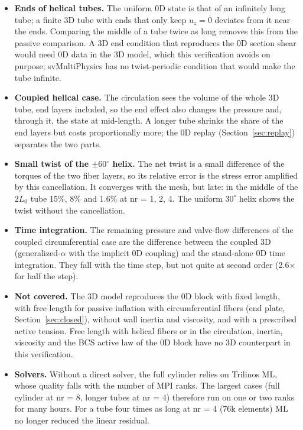 \begin{itemize}
\item \textbf{Ends of helical tubes.} The uniform 0D state is that of an infinitely long
tube; a finite 3D tube with ends that only keep $u_z = 0$ deviates from it near the ends.
Comparing the middle of a tube twice as long removes this from the passive comparison. A 3D end
condition that reproduces the 0D section shear would need 0D data in the 3D model, which
this verification avoids on purpose; svMultiPhysics has no twist-periodic condition
that would make the tube infinite.
\item \textbf{Coupled helical case.} The circulation sees the volume of the whole 3D
tube, end layers included, so the end effect also changes the pressure and, through it,
the state at mid-length. A longer tube shrinks the share of the end layers but costs
proportionally more; the 0D replay (Section~\ref{sec:replay}) separates the two parts.
\item \textbf{Small twist of the $\pm60^\circ$ helix.} The net twist is a small
difference of the torques of the two fiber layers, so its relative error is the stress
error amplified by this cancellation. It converges with the mesh, but late: in the middle
of the $2L_0$ tube 15\%, 8\% and 1.6\% at nr = 1, 2, 4. The uniform $30^\circ$ helix shows
the twist without the cancellation.
\item \textbf{Time integration.} The remaining pressure and valve-flow differences of the
coupled circumferential case are the difference between the coupled 3D (generalized-$\alpha$
with the implicit 0D coupling) and the stand-alone 0D time integration. They fall with
the time step, but not quite at second order (2.6$\times$ for half the step).
\item \textbf{Not covered.} The 3D model reproduces the 0D block with fixed length,
with free length for passive inflation with circumferential fibers (end plate,
Section~\ref{sec:closed}), without wall inertia and viscosity, and with a prescribed
active tension. Free length with helical fibers or in the circulation, inertia, viscosity
and the BCS active law of the 0D block have no 3D counterpart in this verification.
\item \textbf{Solvers.} Without a direct solver, the full cylinder relies on Trilinos ML,
whose quality falls with the number of MPI ranks. The largest cases (full cylinder at
nr = 8, longer tubes at nr = 4) therefore run on one or two ranks for many hours. For a
tube four times as long at nr = 4 (76k elements) ML no longer reduced the linear residual.
\end{itemize}
